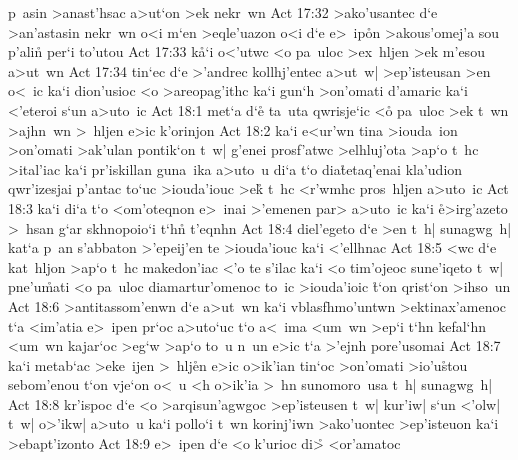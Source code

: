 p~asin
>anast'hsac
a>ut`on
>ek
nekr~wn\bibvsend
\vs Act 17:32
>ako'usantec
d`e
>an'astasin
nekr~wn
o<i
m`en
>eqle'uazon
o<i
d`e
e>~ip\r{o}n
>akous'omej'a
sou
p'alin\r{}
per`i
to'utou\bibvsend
\vs Act 17:33
k\r{a}`i
o<'utwc
<o
pa~uloc
>ex~hljen
>ek
m'esou
a>ut~wn\bibvsend
\vs Act 17:34
tin`ec
d`e
>'andrec
kollhj'entec
a>ut~w|
>ep'isteusan
>en
o<~ic
ka`i
dion'usioc
<o
>areopag'ithc
ka`i
gun`h
>on'omati
d'amaric
ka`i
<'eteroi
s`un
a>uto~ic\bibvsend
\vs Act 18:1
met`a
d`e\r{}
ta~uta
qwrisje`ic
<o\r{}
pa~uloc
>ek
t~wn
>ajhn~wn
>~hljen
e>ic
k'orinjon\bibvsend
\vs Act 18:2
ka`i
e<ur'wn
tina
>iouda~ion
>on'omati
>ak'ulan
pontik`on
t~w|
g'enei
prosf'atwc
>elhluj'ota
>ap`o
t~hc
>ital'iac
ka`i
pr'iskillan
guna~ika
a>uto~u
di`a
t`o
dia\r{t}etaq'enai
kla'udion
qwr'izesjai
p'antac
to`uc
>iouda'iouc
>e\r{k}
t~hc
<r'wmhc
pros~hljen
a>uto~ic\bibvsend
\vs Act 18:3
ka`i
di`a
t`o
<om'oteqnon
e>~inai
>'emenen
par>
a>uto~ic
ka`i
\r{e}>irg'azeto
>~hsan
g`ar
skhnopoio`i
t`hn\r{}
t'eqnhn\bibvsend
\vs Act 18:4
diel'egeto
d`e
>en
t~h|
sunagwg~h|
kat`a
p~an
s'abbaton
>'epeij'en
te
>iouda'iouc
ka`i
<'ellhnac\bibvsend
\vs Act 18:5
<wc
d`e
kat~hljon
>ap`o
t~hc
makedon'iac
<'o
te
s'ilac
ka`i
<o
tim'ojeoc
sune'iqeto
t~w|
pne'u\r{m}ati
<o
pa~uloc
diamartur'omenoc
to~ic
>iouda'ioic
\r{t}`on
qrist`on
>ihso~un\bibvsend
\vs Act 18:6
>antitassom'enwn
d`e
a>ut~wn
ka`i
vblasfhmo'untwn
>ektinax'amenoc
t`a
<im'atia
e>~ipen
pr`oc
a>uto`uc
t`o
a<~ima
<um~wn
>ep`i
t`hn
kefal`hn
<um~wn
kajar`oc
>eg`w
>ap`o
to~u
n~un
e>ic
t`a
>'ejnh
pore'usomai\bibvsend
\vs Act 18:7
ka`i
metab`ac
>eke~ijen
>~hlj\r{e}n
e>ic
o>ik'ian
tin`oc
>on'omati
>io'u\r{s}tou
sebom'enou
t`on
vje`on
o<~u
<h
o>ik'ia
>~hn
sunomoro~usa
t~h|
sunagwg~h|\bibvsend
\vs Act 18:8
kr'ispoc
d`e
<o
>arqisun'agwgoc
>ep'isteusen
t~w|
kur'iw|
s`un
<'olw|
t~w|
o>'ikw|
a>uto~u
ka`i
pollo`i
t~wn
korinj'iwn
>ako'uontec
>ep'isteuon
ka`i
>ebapt'izonto\bibvsend
\vs Act 18:9
e>~ipen
d`e
<o
k'urioc
di>\r{}
<or'amatoc
